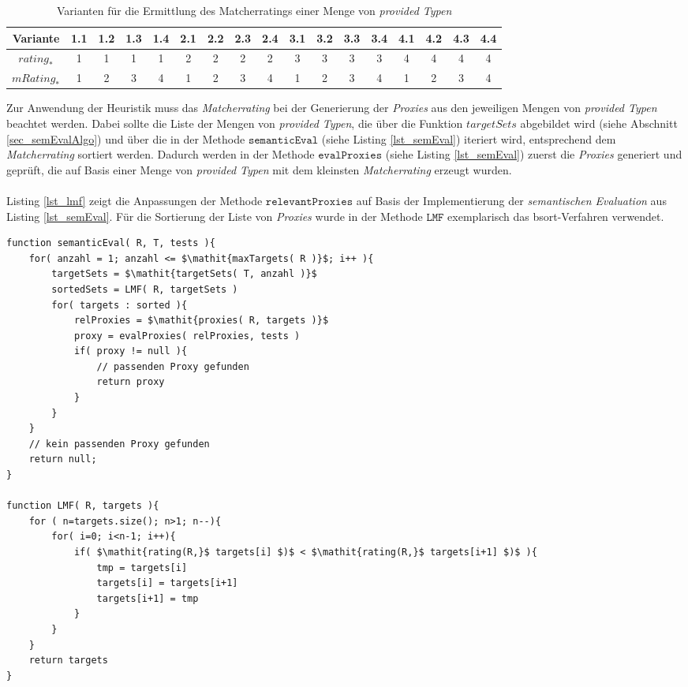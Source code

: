 \begin{table}[h!]
\centering
\small
\begin{tabular}{|c|c|c|c|c|c|c|c|c|c|c|c|c|c|c|c|c|}
\hline
\hline
\textbf{Variante} & 1.1 & 1.2 & 1.3 & 1.4 
& 2.1 & 2.2 & 2.3 & 2.4 
& 3.1 & 3.2 & 3.3 & 3.4 
& 4.1 & 4.2 & 4.3 & 4.4 
\\
\hline
$\mathit{rating}_{*}$& 1 & 1 & 1 & 1
& 2 & 2 & 2 & 2 
& 3 & 3 & 3 & 3 
& 4 & 4 & 4 & 4 
\\
\hline
$\mathit{mRating}_{*}$ & 1 & 2 & 3 & 4 
& 1 & 2 & 3 & 4 
& 1 & 2 & 3 & 4 
& 1 & 2 & 3 & 4 
\\
\hline
\hline
\end{tabular}
\caption{Varianten für die Ermittlung des Matcherratings einer Menge von \emph{provided Typen}}
 \label{tab_matcherratingvarianten}
\end{table}
\noindent
Zur Anwendung der \Gls{Heuristik} muss das \emph{Matcherrating} bei der Generierung der \emph{Proxies} aus den jeweiligen Mengen von \emph{provided Typen} beachtet werden. Dabei sollte die Liste der Mengen von \emph{provided Typen}, die über die Funktion $\mathit{targetSets}$ abgebildet wird (siehe Abschnitt \ref{sec_semEvalAlgo}) und über die in der Methode $\texttt{semanticEval}$ (siehe Listing \ref{lst_semEval}) iteriert wird, entsprechend dem \emph{Matcherrating} sortiert werden. Dadurch werden in der Methode $\texttt{evalProxies}$ (siehe Listing \ref{lst_semEval}) zuerst die \emph{Proxies} generiert und geprüft, die auf Basis einer Menge von \emph{provided Typen} mit dem kleinsten \emph{Matcherrating} erzeugt wurden.
\\\\
Listing \ref{lst_lmf} zeigt die Anpassungen der Methode $\texttt{relevantProxies}$ auf Basis der Implementierung der \emph{semantischen Evaluation} aus Listing \ref{lst_semEval}. Für die Sortierung der Liste von \emph{Proxies} wurde in der Methode $\texttt{LMF}$ exemplarisch das \Gls{bsort}-Verfahren verwendet.

\begin{lstlisting}[style = pseudo, caption=Semantische Evaluation mit Heuristik LMF, captionpos=b, label = lst_lmf]
function semanticEval( R, T, tests ){
	for( anzahl = 1; anzahl <= $\mathit{maxTargets( R )}$; i++ ){
		targetSets = $\mathit{targetSets( T, anzahl )}$
		sortedSets = LMF( R, targetSets )		
		for( targets : sorted ){
			relProxies = $\mathit{proxies( R, targets )}$
			proxy = evalProxies( relProxies, tests )	
			if( proxy != null ){
				// passenden Proxy gefunden
				return proxy
			}
		}
	}
	// kein passenden Proxy gefunden
	return null;
}

function LMF( R, targets ){
	for	( n=targets.size(); n>1; n--){
		for( i=0; i<n-1; i++){
			if( $\mathit{rating(R,}$ targets[i] $)$ < $\mathit{rating(R,}$ targets[i+1] $)$ ){
				tmp = targets[i]
				targets[i] = targets[i+1]
				targets[i+1] = tmp
			}
		}
	}	
	return targets
}
\end{lstlisting}


